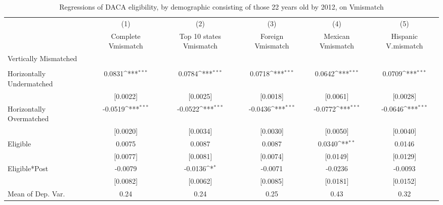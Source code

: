 \begin{table}[htbp]\centering
\def\sym#1{\ifmmode^{#1}\else\(^{#1}\)\fi}
\caption{Regressions of DACA eligibility, by demographic consisting of those 22 years old by 2012, on Vmismatch}
\begin{tabular}{l*{5}{c}}
\toprule
                    &\multicolumn{1}{c}{(1)}         &\multicolumn{1}{c}{(2)}         &\multicolumn{1}{c}{(3)}         &\multicolumn{1}{c}{(4)}         &\multicolumn{1}{c}{(5)}         \\
                    &Complete Vmismatch         &Top 10 states Vmismatch         &Foreign Vmismatch         &Mexican Vmismatch         &Hispanic V.mismatch         \\
\midrule
Vertically Mismatched&                     &                     &                     &                     &                     \\
                    &                     &                     &                     &                     &                     \\
\addlinespace
Horizontally Undermatched&      0.0831\sym{***}&      0.0784\sym{***}&      0.0718\sym{***}&      0.0642\sym{***}&      0.0709\sym{***}\\
                    &    [0.0022]         &    [0.0025]         &    [0.0018]         &    [0.0061]         &    [0.0028]         \\
\addlinespace
Horizontally Overmatched&     -0.0519\sym{***}&     -0.0522\sym{***}&     -0.0436\sym{***}&     -0.0772\sym{***}&     -0.0646\sym{***}\\
                    &    [0.0020]         &    [0.0034]         &    [0.0030]         &    [0.0050]         &    [0.0040]         \\
\addlinespace
Eligible            &      0.0075         &      0.0087         &      0.0087         &      0.0340\sym{**} &      0.0146         \\
                    &    [0.0077]         &    [0.0081]         &    [0.0074]         &    [0.0149]         &    [0.0129]         \\
\addlinespace
Eligible*Post       &     -0.0079         &     -0.0136\sym{*}  &     -0.0071         &     -0.0236         &     -0.0093         \\
                    &    [0.0082]         &    [0.0062]         &    [0.0085]         &    [0.0181]         &    [0.0152]         \\
\midrule
Mean of Dep. Var.   &        0.24         &        0.24         &        0.25         &        0.43         &        0.32         \\

\end{tabular}
\end{table}
